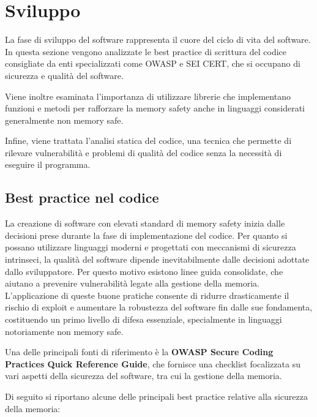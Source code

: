 \section{Sviluppo}
\label{sec:development}

La fase di sviluppo del software rappresenta il cuore del ciclo di vita del software.
In questa sezione vengono analizzate le best practice di scrittura del codice
consigliate da enti specializzati come OWASP e SEI CERT, che si occupano di sicurezza
e qualità del software.

Viene inoltre esaminata l'importanza di utilizzare librerie che implementano funzioni
e metodi per rafforzare la memory safety anche in linguaggi considerati generalmente
non memory safe.

Infine, viene trattata l'analisi statica del codice, una tecnica che permette di
rilevare vulnerabilità e problemi di qualità del codice senza la necessità di eseguire
il programma.

\subsection{Best practice nel codice}
\label{sec:best-practices-codice}

La creazione di software con elevati standard di memory safety inizia dalle
decisioni prese durante la fase di implementazione del codice. Per quanto si possano
utilizzare linguaggi moderni e progettati con meccanismi di sicurezza intrinseci,
la qualità del software dipende inevitabilmente dalle decisioni adottate dallo
sviluppatore. Per questo motivo esistono linee guida consolidate, che aiutano a
prevenire vulnerabilità legate alla gestione della memoria. L'applicazione di queste
buone pratiche consente di ridurre drasticamente il rischio di exploit e aumentare
la robustezza del software fin dalle sue fondamenta, costituendo un primo
livello di difesa essenziale, specialmente in linguaggi notoriamente non memory safe.

Una delle principali fonti di riferimento è la \textbf{OWASP Secure Coding
Practices Quick Reference Guide}\cite{owasp_best_practices}, che fornisce una
checklist focalizzata su vari aspetti della sicurezza del software, tra cui la gestione
della memoria.

Di seguito si riportano alcune delle principali best practice relative alla sicurezza
della memoria:

